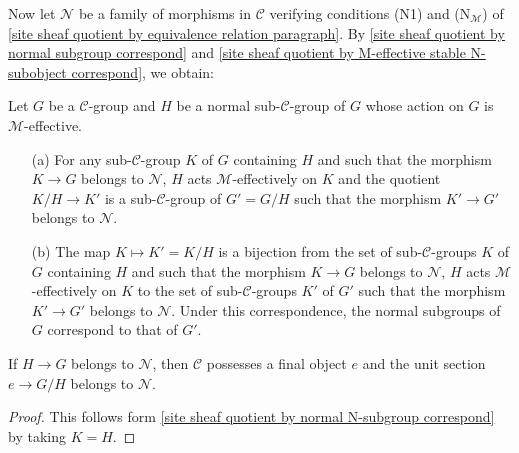 Now let $\mathcal{N}$ be a family of morphisms in $\mathcal{C}$ verifying conditions (N1) and ($\text{N}_\mathcal{M}$) of \cref{site sheaf quotient by equivalence relation paragraph}. By \cref{site sheaf quotient by normal subgroup correspond} and \cref{site sheaf quotient by M-effective stable N-subobject correspond}, we obtain:
\begin{proposition}\label{site sheaf quotient by normal N-subgroup correspond}
Let $G$ be a $\mathcal{C}$-group and $H$ be a normal sub-$\mathcal{C}$-group of $G$ whose action on $G$ is $\mathcal{M}$-effective.
\begin{enumerate}
    \item[(a)] For any sub-$\mathcal{C}$-group $K$ of $G$ containing $H$ and such that the morphism $K\to G$ belongs to $\mathcal{N}$, $H$ acts $\mathcal{M}$-effectively on $K$ and the quotient $K/H\to K'$ is a sub-$\mathcal{C}$-group of $G'=G/H$ such that the morphism $K'\to G'$ belongs to $\mathcal{N}$.
    \item[(b)] The map $K\mapsto K'=K/H$ is a bijection from the set of sub-$\mathcal{C}$-groups $K$ of $G$ containing $H$ and such that the morphism $K\to G$ belongs to $\mathcal{N}$, $H$ acts $\mathcal{M}$-effectively on $K$ to the set of sub-$\mathcal{C}$-groups $K'$ of $G'$ such that the morphism $K'\to G'$ belongs to $\mathcal{N}$. Under this correspondence, the normal subgroups of $G$ correspond to that of $G'$.
\end{enumerate}
\end{proposition}
\begin{corollary}\label{site sheaf quotient by normal N-subgroup unit section in N}
If $H\to G$ belongs to $\mathcal{N}$, then $\mathcal{C}$ possesses a final object $e$ and the unit section $e\to G/H$ belongs to $\mathcal{N}$.
\end{corollary}
\begin{proof}
This follows form \cref{site sheaf quotient by normal N-subgroup correspond} by taking $K=H$.
\end{proof}

